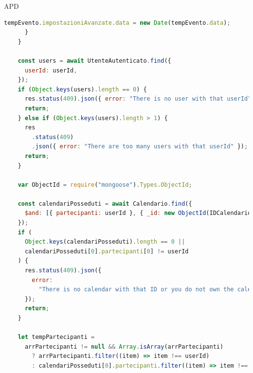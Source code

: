 \begin{listaPersonale} {APD}
\begin{listaPersonale2}[APD]{}
\begin{lstlisting}[language=JavaScript]
        tempEvento.impostazioniAvanzate.data = new Date(tempEvento.data);
      }
    }

    const users = await UtenteAutenticato.find({
      userId: userId,
    });
    if (Object.keys(users).length == 0) {
      res.status(409).json({ error: "There is no user with that userId" });
      return;
    } else if (Object.keys(users).length > 1) {
      res
        .status(409)
        .json({ error: "There are too many users with that userId" });
      return;
    }

    var ObjectId = require("mongoose").Types.ObjectId;

    const calendariPosseduti = await Calendario.find({
      $and: [{ partecipanti: userId }, { _id: new ObjectId(IDCalendario) }],
    });
    if (
      Object.keys(calendariPosseduti).length == 0 ||
      calendariPosseduti[0].partecipanti[0] != userId
    ) {
      res.status(409).json({
        error:
          "There is no calendar with that ID or you do not own the calendar",
      });
      return;
    }

    let tempPartecipanti =
      arrPartecipanti != null && Array.isArray(arrPartecipanti)
        ? arrPartecipanti.filter((item) => item !== userId)
        : calendariPosseduti[0].partecipanti.filter((item) => item !== userId);


\end{lstlisting}
\end{listaPersonale2}
\end{listaPersonale}
